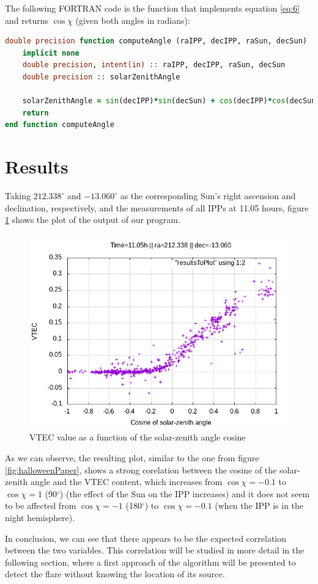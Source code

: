 The following FORTRAN code is the function that implements equation \ref{eq:6} and returns $\cos \chi$ (given both angles in radians):

\begin{minipage}{\linewidth}
\begin{lstlisting}[language=Fortran, caption=Computation of the solar-zenith a angle's cosine]
double precision function computeAngle (raIPP, decIPP, raSun, decSun)
	implicit none
	double precision, intent(in) :: raIPP, decIPP, raSun, decSun
	double precision :: solarZenithAngle
	
	solarZenithAngle = sin(decIPP)*sin(decSun) + cos(decIPP)*cos(decSun)*cos(raIPP - raSun)
	return
end function computeAngle
\end{lstlisting}
\end{minipage}

\section{Results}

Taking $212.338^{\circ}$ and $-13.060^{\circ}$ as the corresponding Sun's right ascension and declination, respectively, and the measurements of all IPPs at 11.05 hours, figure \ref{fig:results} shows the plot of the output of our program.

\begin{figure}[!htb]
\begin{centering}
	\includegraphics[width=0.5\linewidth]{images/ch4/resultSunTest.png}
	\caption{VTEC value as a function of the solar-zenith angle cosine}
	\label{fig:results}
\end{centering}
\end{figure}

As we can observe, the resulting plot, similar to the one from figure \ref{fig:halloweenPaper}, shows a strong corelation between the cosine of the solar-zenith angle and the VTEC content, which increases from $\cos\chi = -0.1$ to $\cos\chi = 1$ (90$^{\circ}$) (the effect of the Sun on the IPP increases) and it does not seem to be affected from $\cos\chi = -1$ (180$^{\circ}$) to $\cos\chi = -0.1$ (when the IPP is in the night hemisphere).

In conclusion, we can see that there appears to be the expected correlation between the two variables. This correlation will be studied in more detail in the following section, where a first approach of the algorithm will be presented to detect the flare without knowing the location of its source.













